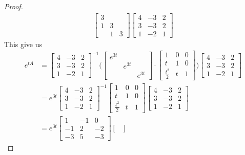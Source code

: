 \documentclass{report}
\begin{document}
\begin{proof}
\begin{align*}
\begin{bmatrix}
  3 & & \\
  1 & 3 & \\
    & 1 & 3
\end{bmatrix} \begin{bmatrix}
  4 & -3 & 2 \\
  3 & -3 & 2 \\
  1 & -2 & 1
\end{bmatrix}
\end{align*}
This give us 
\begin{align*}
e^{tA}&=  \begin{bmatrix}
  4 & -3 & 2 \\
  3 & -3 & 2 \\
  1 & -2 & 1 
\end{bmatrix}^{-1}  \Big( \begin{bmatrix}
  e^{3t} & & \\
      & e^{3t} &  \\
      & & e^{3t}
\end{bmatrix}\cdot  \begin{bmatrix}
   1 & 0 & 0 \\
   t & 1 & 0 \\
   \frac{t^2}{2} & t & 1
\end{bmatrix}\Big)\begin{bmatrix}
  4 & -3 & 2 \\
  3 & -3 & 2 \\
  1 & -2 & 1 
\end{bmatrix}  \\
&= e^{3t}  \begin{bmatrix}
  4 & -3 & 2 \\
  3 & -3 & 2 \\
  1 & -2 & 1 
\end{bmatrix}^{-1}    \begin{bmatrix}
   1 & 0 & 0 \\
   t & 1 & 0 \\
   \frac{t^2}{2} & t & 1
\end{bmatrix}\begin{bmatrix}
  4 & -3 & 2 \\
  3 & -3 & 2 \\
  1 & -2 & 1 
\end{bmatrix}    \\
&=  e^{3t}  \begin{bmatrix}
  1 & -1 & 0 \\
  -1 & 2 & -2\\
  -3 & 5 & -3  
\end{bmatrix}     \begin{bmatrix}

\end{bmatrix}
\end{align*}
\end{proof}
\end{document}
